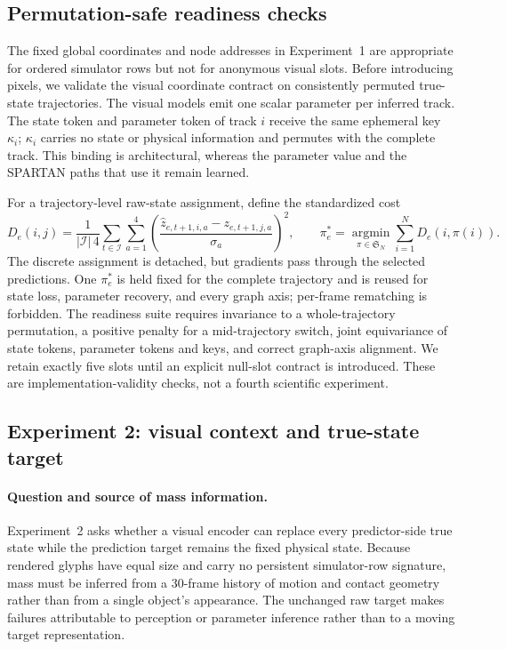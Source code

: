 \subsection{Permutation-safe readiness checks}
\label{sec:experiments:readiness}

The fixed global coordinates and node addresses in Experiment~1 are appropriate for ordered
simulator rows but not for anonymous visual slots.  Before introducing pixels, we validate the
visual coordinate contract on consistently permuted true-state trajectories.  The visual models
emit one scalar parameter per inferred track.  The state token and parameter token of track $i$
receive the same ephemeral key $\kappa_i$; $\kappa_i$ carries no state or physical information
and permutes with the complete track.  This binding is architectural, whereas the parameter value
and the SPARTAN paths that use it remain learned.

For a trajectory-level raw-state assignment, define the standardized cost
\begin{equation}
    D_e(i,j)=\frac{1}{|\mathcal I|\,4}
      \sum_{t\in\mathcal I}\sum_{a=1}^{4}
      \left(
        \frac{\widehat z_{e,t+1,i,a}-z_{e,t+1,j,a}}{\sigma_a}
      \right)^2,
    \qquad
    \pi_e^*=\underset{\pi\in\mathfrak S_N}{\operatorname{argmin}}
      \sum_{i=1}^{N}D_e(i,\pi(i)).
    \label{eq:trajectory-hungarian-raw}
\end{equation}
The discrete assignment is detached, but gradients pass through the selected predictions.  One
$\pi_e^*$ is held fixed for the complete trajectory and is reused for state loss, parameter
recovery, and every graph axis; per-frame rematching is forbidden.  The readiness suite requires
invariance to a whole-trajectory permutation, a positive penalty for a mid-trajectory switch,
joint equivariance of state tokens, parameter tokens and keys, and correct graph-axis alignment.
We retain exactly five slots until an explicit null-slot contract is introduced.  These are
implementation-validity checks, not a fourth scientific experiment.

\subsection{Experiment 2: visual context and true-state target}
\label{sec:experiments:visual-state}

\paragraph{Question and source of mass information.}
Experiment~2 asks whether a visual encoder can replace every predictor-side true state while the
prediction target remains the fixed physical state.  Because rendered glyphs have equal size and
carry no persistent simulator-row signature, mass must be inferred from a 30-frame history of
motion and contact geometry rather than from a single object's appearance.  The unchanged raw
target makes failures attributable to perception or parameter inference rather than to a moving
target representation.

